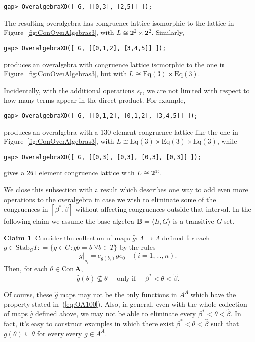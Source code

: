 \documentclass[cm,dissertation,actual,final]{uhthesis}
\theoremstyle{plain}
\theoremstyle{definition}
\newcounter{claim}
\newtheorem{claim}[claim]{Claim}
\theoremstyle{remark}
\numberwithin{theorem}{section}
\numberwithin{claim}{chapter}
\numberwithin{equation}{section}
\numberwithin{conjecture}{chapter}
\newcommand{\<}{\ensuremath{\langle}}
\renewcommand{\>}{\ensuremath{\rangle}}
\newcommand{\Eq}{\ensuremath{\mathrm{Eq}}}
\newcommand{\Stab}{\ensuremath{\mathrm{Stab}}}
\newcommand{\Con}{\ensuremath{\mathrm{Con\,}}}
\newcommand{\0}{\ensuremath{\mathbf{0}}}
\newcommand{\1}{\ensuremath{\mathbf{1}}}
\newcommand{\2}{\ensuremath{\mathbf{2}}}
\newcommand{\3}{\ensuremath{\mathbf{3}}}
\newcommand{\4}{\ensuremath{\mathbf{4}}}
\newcommand{\5}{\ensuremath{\mathbf{5}}}
\newcommand{\bA}{\ensuremath{\mathbf{A}}}
\newcommand{\bB}{\ensuremath{\mathbf{B}}}
\newcommand{\resBi}{\ensuremath{|_{_{B_i}}}}
\newcommand{\two}{\ensuremath{\mathbf{2}}}
\begin{document}
{\footnotesize
\begin{verbatim}
gap> OveralgebraXO([ G, [[0,3], [2,5]] ]);
\end{verbatim}
}

\noindent The resulting overalgebra has congruence lattice isomorphic to the lattice in
Figure~\ref{fig:ConOverAlgebras3}, with
$L \cong \two^2\times\two^2$.  
Similarly, 

{\footnotesize
\begin{verbatim}
gap> OveralgebraXO([ G, [[0,1,2], [3,4,5]] ]);
\end{verbatim}
}

\noindent produces an overalgebra with congruence lattice isomorphic to the one in
Figure~\ref{fig:ConOverAlgebras3}, but with
$L \cong \Eq(3) \times\Eq(3)$.

Incidentally, with the additional operations $s_r$, we
are not limited with respect to how many terms appear in the direct
product.  For example, 

{\footnotesize
\begin{verbatim}
gap> OveralgebraXO([ G, [[0,1,2], [0,1,2], [3,4,5]] ]);
\end{verbatim}
}

\noindent produces an overalgebra with a 130 element congruence lattice 
like the one in Figure~\ref{fig:ConOverAlgebras3}, with 
$L \cong \Eq(3)\times \Eq(3)\times \Eq(3)$, while

{\footnotesize
\begin{verbatim}
gap> OveralgebraXO([ G, [[0,3], [0,3], [0,3], [0,3]] ]);
\end{verbatim}
}

\noindent gives a 261 element congruence lattice 
with $L \cong \two^{16}$. %

We close this subsection with a result which describes one way to add even more
operations to the overalgebra in case we wish to eliminate some of the
congruences in $[\beta^*, \widehat{\beta}]$ without affecting congruences outside that
interval.  In the following claim we assume the base algebra $\bB = \<B, G\>$ is a
transitive $G$-set.
\begin{claim}
Consider the collection of maps $\widehat{g}:A\rightarrow A$ defined 
for each $g\in \Stab_GT: = \{g\in G : gb = b \; \forall b \in T\}$ by the rules
\[
\widehat{g}\resBi = e_{g(b_i)} g e_0 \quad (i=1, \dots, n).
\]
Then, for each $\theta \in \Con \bA$,
\begin{equation}
  \label{eq:OA100}
  \widehat{g}(\theta) \nsubseteq \theta \quad \text{ only if } \quad
  \beta^* <\theta <\widehat{\beta}.
\end{equation}
\end{claim}
Of course, these $\widehat{g}$ maps may not be the only
functions in $A^A$ which have the property stated in~(\ref{eq:OA100}).
Also, in general, even with the whole collection of maps $\widehat{g}$ defined
above, we may not be able to eliminate every  $\beta^* <\theta
<\widehat{\beta}$.  
In fact, it's easy to construct examples in which there exist
$\beta^* <\theta <\widehat{\beta}$ such that 
$g(\theta) \subseteq \theta$ for every every $g \in A^A$.
\end{document}
